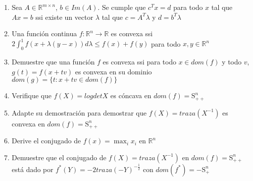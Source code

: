 \begin{enumerate}
\item Sea $A \in \mathbb{R}^{m \times n}$, $b \in Im(A)$. Se cumple que $c^Tx=d$ para todo $x$ tal que $Ax = b$ ssi existe un vector $\lambda$ tal que  $c=A^T \lambda$ y $d=b^T \lambda$

\item Una función continua $f:\mathbb{R}^n \rightarrow \mathbb{R}$ es convexa ssi $2\int_0^1 f(x + \lambda (y-x))d \lambda \leq f(x) + f(y)$ para todo $x,y \in \mathbb{R}^n$

\item Demuestre que una función $f$ es convexa ssi para todo $x \in dom(f)$ y todo $v$, $g(t)=f(x+tv)$ es convexa en su dominio $dom(g)=\{t:x+tv \in dom(f)\}$

\item Verifique que $f(X) = logdetX$ es cóncava en $dom(f)=\mathrm{S}_{++}^n$

\item Adapte su demostración para demostrar que $f(X)=traza(X^{-1})$ es convexa en $dom(f)=\mathrm{S}_{++}^n$

\item Derive el conjugado de $f(x)=\max_i x_i$ en $\mathbb{R}^n$

\item Demuestre que el conjugado de $f(X)=traza(X^{-1})$ en $dom(f)=\mathrm{S}_{++}^n$ está dado por $f^*(Y)=-2traza(-Y)^{-\frac{1}{2}}$ con $dom(f^*)=-\mathrm{S}_{+}^n$

\end{enumerate}
